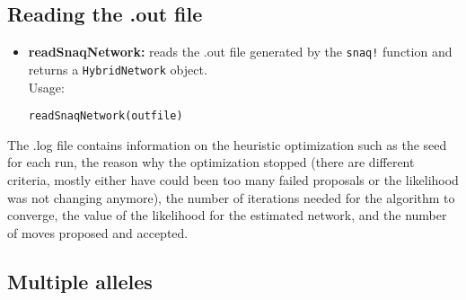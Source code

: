 \documentclass[12pt]{article}
\begin{document}
\subsection{Reading the .out file}
\begin{itemize}
\item \textbf{readSnaqNetwork:} reads the .out file generated by the
  \texttt{snaq!} function and returns a \texttt{HybridNetwork}
  object.\\
Usage:
\begin{lstlisting}
readSnaqNetwork(outfile)
\end{lstlisting}
\end{itemize}

The .log file contains information on the heuristic optimization such
as the seed for each run, the reason why the optimization stopped
(there are different criteria, mostly either have could been too many
failed proposals or the likelihood was not changing anymore), the
number of iterations needed for the algorithm to converge, the value
of the likelihood for the estimated network, and the number of moves
proposed and accepted.

\subsection{Multiple alleles}
\end{document}
